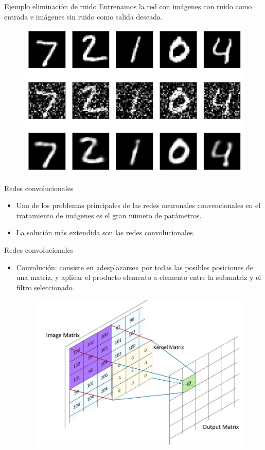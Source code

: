 \documentclass[spanish]{beamer}
\begin{document}
\begin{frame}{Ejemplo eliminación de ruido}
Entrenamos la red con imágenes con ruido como entrada e imágenes sin ruido como
salida deseada.
\begin{figure}[h]
  \includegraphics[width=.6\textwidth]{img/autoencoder_ex2}
\end{figure}
\end{frame}

\begin{frame}{Redes convolucionales}
    \begin{itemize}
        \item Uno de los problemas principales de las redes neuronales convencionales en el tratamiento de imágenes es el gran número de parámetros.
        \item La solución más extendida son las redes convolucionales.
    \end{itemize}
\end{frame}

\begin{frame}{Redes convolucionales}
  \begin{itemize}
    \item Convolución: consiste en «desplazarse» por todas las posibles posiciones de una matriz, y aplicar el producto elemento a elemento entre la submatriz y el filtro seleccionado.

    \begin{figure}[h]
      \centering
      \includegraphics[width=.6\textwidth]{img/conv}
    \end{figure}
  \end{itemize}
\end{frame}
\end{document}
